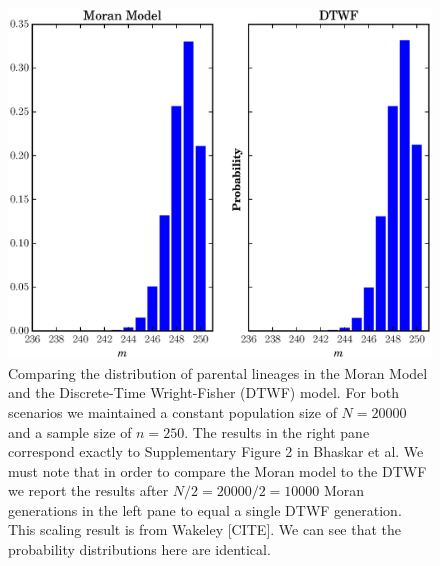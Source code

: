 \documentclass[11pt]{article}
\begin{document}
\begin{center}
	\begin{figure}[!h]
		\includegraphics[scale=0.85]{../plots/figure1}
		\caption{Comparing the distribution of parental lineages in the Moran Model and the Discrete-Time Wright-Fisher (DTWF) model. For both scenarios we maintained a constant population size of $N = 20000$ and a sample size of $n=250$. The results in the right pane correspond exactly to Supplementary Figure 2 in Bhaskar et al. We must note that in order to compare the Moran model to the DTWF we report the results after $N/2 = 20000/2 = 10000$ Moran generations in the left pane to equal a single DTWF generation. This scaling result is from Wakeley [CITE]. We can see that the probability distributions here are identical.}
	\end{figure}
\end{center}
\end{document}

